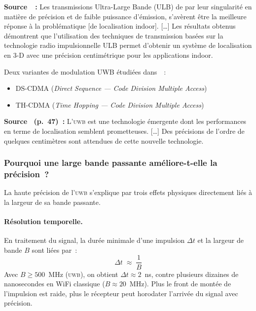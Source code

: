 \documentclass[12pt, a4paper]{article}
\newcommand{\UWB}{\textsc{uwb}}
\begin{document}
\begin{citebox}
\textbf{Source~\cite{Kossonou2014}~:} \og{}Les transmissions Ultra-Large Bande
(ULB) de par leur singularité en matière de précision et de faible puissance
d'émission, s'avèrent être la meilleure réponse à la problématique [de localisation
indoor]. [\ldots] Les résultats obtenus démontrent que l'utilisation des techniques
de transmission basées sur la technologie radio impulsionnelle ULB permet d'obtenir
un système de localisation en 3-D avec une précision centimétrique pour les
applications indoor.\fg{}
\end{citebox}

Deux variantes de modulation UWB étudiées dans~\cite{Kossonou2014}~:
\begin{itemize}
  \item DS-CDMA (\textit{Direct Sequence — Code Division Multiple Access})
  \item TH-CDMA (\textit{Time Hopping — Code Division Multiple Access})
\end{itemize}

\begin{citebox}
\textbf{Source~\cite{Evennou2007} (p.~47)~:} \og{}L'\UWB{} est une technologie
émergente dont les performances en terme de localisation semblent prometteuses.
[\ldots] Des précisions de l'ordre de quelques centimètres sont attendues de cette
nouvelle technologie.\fg{}
\end{citebox}

\subsubsection*{Pourquoi une large bande passante améliore-t-elle la précision~?}

La haute précision de l'\UWB{} s'explique par trois effets physiques directement
liés à la largeur de sa bande passante.

\paragraph{Résolution temporelle.}
En traitement du signal, la durée minimale d'une impulsion $\Delta t$ et la largeur
de bande $B$ sont liées par~:
\begin{equation*}
  \Delta t \;\approx\; \frac{1}{B}
\end{equation*}
Avec $B \geq 500$~MHz (\UWB{}), on obtient $\Delta t \approx 2$~ns, contre
plusieurs dizaines de nanosecondes en WiFi classique ($B \approx 20$~MHz). Plus
le front de montée de l'impulsion est raide, plus le récepteur peut horodater
l'arrivée du signal avec précision.
\end{document}
